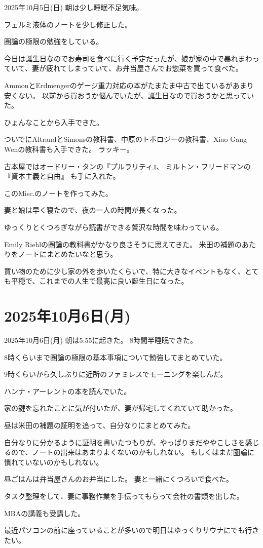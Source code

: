 \documentclass[dvipdfmx, autodetect-engine, aspectratio=169, 10.5pt]{beamer}
\begin{document}
\begin{frame}{2025年10月5日(日)}
	\scriptsize
	朝は少し睡眠不足気味。

	フェルミ液体のノートを少し修正した。

	圏論の極限の勉強をしている。

	今日は誕生日なのでお寿司を食べに行く予定だったが、娘が家の中で暴れまわっていて、妻が疲れてしまっていて、お弁当屋さんでお惣菜を買って食べた。

	AmmonとErdmengerのゲージ重力対応の本がたまたま中古で出ているがあまり安くない。
	以前から買おうか悩んでいたが、誕生日なので買おうかと思っていた。

	ひょんなことから入手できた。

	ついでにAltrandとSimonsの教科書、中原のトポロジーの教科書、Xiao Gang Wenの教科書も入手できた。
	ラッキー。

	古本屋ではオードリー・タンの『プルラリティ』、
	ミルトン・フリードマンの『資本主義と自由』
	も手に入れた。

	このMisc.のノートを作ってみた。

	妻と娘は早く寝たので、夜の一人の時間が長くなった。

	ゆっくりとくつろぎながら読書ができる贅沢な時間を味わっている。

	Emily Riehlの圏論の教科書がかなり良さそうに思えてきた。
	米田の補題のあたりをノートにまとめたいなと思う。

	買い物のために少し家の外を歩いたくらいで、特に大きなイベントもなく、とても平穏で、これまでの人生で最高に良い誕生日になった。
\end{frame}

\section{2025年10月6日(月)}

\begin{frame}{2025年10月6日(月)}
	朝は5:55に起きた。
	8時間半睡眠できた。

	8時くらいまで圏論の極限の基本事項について勉強してまとめていた。

	9時くらいから久しぶりに近所のファミレスでモーニングを楽しんだ。

	ハンナ・アーレントの本を読んでいた。

	家の鍵を忘れたことに気が付いたが、妻が帰宅してくれていて助かった。

	昼は米田の補題の証明を追って、自分なりにまとめてみた。

	自分なりに分かるように証明を書いたつもりが、やっぱりまだややこしさを感じるので、ノートの出来はあまりよくないのかもしれない。
	もしくはまだ圏論に慣れていないのかもしれない。

	昼ごはんは弁当屋さんのお弁当にした。
	妻と一緒にくつろいで食べた。

	タスク整理をして、妻に事務作業を手伝ってもらって会社の書類を出した。

	MBAの講義も受講した。

	最近パソコンの前に座っていることが多いので明日はゆっくりサウナにでも行きたい。
\end{frame}
\end{document}

